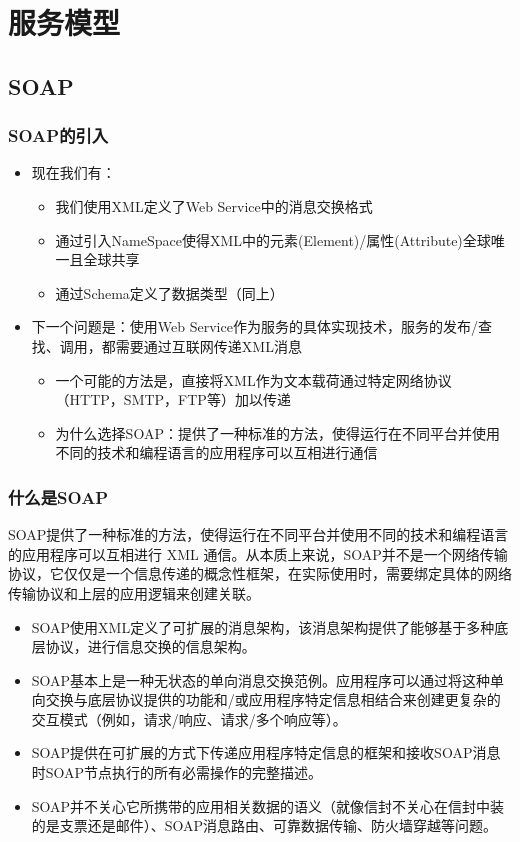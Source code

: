 \section{服务模型}

\subsection{SOAP}

\subsubsection{SOAP的引入}
\begin{itemize}
    \item 现在我们有：
    \begin{itemize}
        \item 我们使用XML定义了Web Service中的消息交换格式
        \item 通过引入NameSpace使得XML中的元素(Element)/属性(Attribute)全球唯一且全球共享
        \item 通过Schema定义了数据类型（同上）
    \end{itemize}
    \item 下一个问题是：使用Web Service作为服务的具体实现技术，服务的发布/查找、调用，都需要通过互联网传递XML消息
    \begin{itemize}
        \item 一个可能的方法是，直接将XML作为文本载荷通过特定网络协议（HTTP，SMTP，FTP等）加以传递
        \item 为什么选择SOAP：提供了一种标准的方法，使得运行在不同平台并使用不同的技术和编程语言的应用程序可以互相进行通信
    \end{itemize}   
\end{itemize}

\subsubsection{什么是SOAP}
SOAP提供了一种标准的方法，使得运行在不同平台并使用不同的技术和编程语言的应用程序可以互相进行 XML 通信。从本质上来说，SOAP并不是一个网络传输协议，它仅仅是一个信息传递的概念性框架，在实际使用时，需要绑定具体的网络传输协议和上层的应用逻辑来创建关联。
\begin{itemize}
    \item SOAP使用XML定义了可扩展的消息架构，该消息架构提供了能够基于多种底层协议，进行信息交换的信息架构。
    \item SOAP基本上是一种无状态的单向消息交换范例。应用程序可以通过将这种单向交换与底层协议提供的功能和/或应用程序特定信息相结合来创建更复杂的交互模式（例如，请求/响应、请求/多个响应等）。
    \item SOAP提供在可扩展的方式下传递应用程序特定信息的框架和接收SOAP消息时SOAP节点执行的所有必需操作的完整描述。
    \item SOAP并不关心它所携带的应用相关数据的语义（就像信封不关心在信封中装的是支票还是邮件）、SOAP消息路由、可靠数据传输、防火墙穿越等问题。
\end{itemize}

